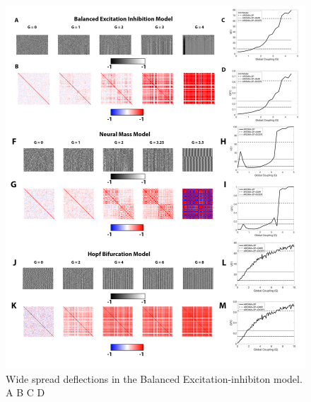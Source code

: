 \documentclass[oneside]{zHenriquesLab-StyleBioRxiv}
\begin{document}
\begin{figure}[ht!]
\includegraphics[width=1\textwidth]{figs/Models_all.png}
\caption{Wide spread deflections in the Balanced Excitation-inhibiton model. A B C D}\label{fig:BalancedEI_G}
\end{figure}


\end{document}
